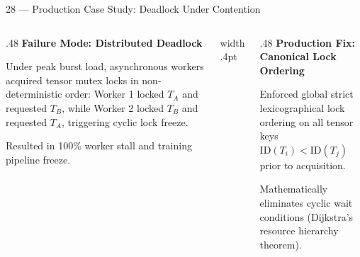 \documentclass[aspectratio=169,10pt]{beamer}
\begin{document}
\begin{frame}{28 — Production Case Study: Deadlock Under Contention}
  \begin{columns}[T,onlytextwidth]
    \begin{column}{.48\textwidth}
      {\small\bfseries\color{BayesCrimson}Failure Mode: Distributed Deadlock}\par\vspace{.06cm}
      {\small Under peak burst load, asynchronous workers acquired tensor mutex locks in non-deterministic order: Worker 1 locked $T_A$ and requested $T_B$, while Worker 2 locked $T_B$ and requested $T_A$, triggering cyclic lock freeze.}\par\vspace{.06cm}
      {\scriptsize\color{BayesSecondary}Resulted in 100\% worker stall and training pipeline freeze.}
    \end{column}
    \hfill{\color{BayesBorder}\vrule width .4pt}\hfill
    \begin{column}{.48\textwidth}
      {\small\bfseries\color{BayesTeal}Production Fix: Canonical Lock Ordering}\par\vspace{.06cm}
      {\small Enforced global strict lexicographical lock ordering on all tensor keys $\text{ID}(T_i) < \text{ID}(T_j)$ prior to acquisition.}\par\vspace{.06cm}
      {\scriptsize\color{BayesSecondary}Mathematically eliminates cyclic wait conditions (Dijkstra's resource hierarchy theorem).}
    \end{column}
  \end{columns}
  \vspace{.20cm}
\end{frame}
\end{document}
